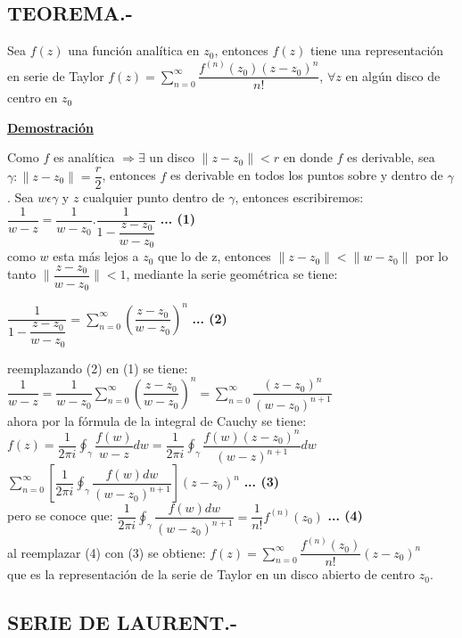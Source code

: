 \documentclass[10pt,a4paper]{article}
\begin{document}
\subsection{TEOREMA.-}
Sea $f(z)$ una función analítica en $z_0$, entonces $f(z)$ tiene una representación en serie de Taylor $\displaystyle{f(z) = \sum_{n=0}^{\infty}\dfrac{f^{(n)}(z_0)(z-z_0)^n}{n!}}$, $\displaystyle{\forall z}$ en algún disco de centro en $z_0$\\
\begin{center}
 \bf \underline{Demostración}
 \end{center} 
 Como $f$ es analítica $\Rightarrow \exists$ un disco $\parallel z- z_0\parallel < r$ en donde $f$ es derivable, sea $\displaystyle{\gamma : \parallel z- z_0\parallel= \dfrac{r}{2}}$, entonces $f$ es derivable en todos los puntos sobre y dentro de $\gamma$.
 Sea $w \epsilon \gamma$ y $z$ cualquier punto dentro de $\gamma$, entonces escribiremos:\\
$\displaystyle{\dfrac{1}{w-z} = \dfrac{1}{w-z_0}. \dfrac{1}{1-\dfrac{z-z_0}{w-z_0}}}$ \textbf{... (1)}\\
como $w$ esta más lejos a $z_0$ que lo de z, entonces $\parallel  z - z_0\parallel < \parallel w - z_0 \parallel$ por lo tanto $\parallel \dfrac{z-z_0}{w-z_0} \parallel < 1$, mediante la serie geométrica se tiene:\\
\begin{center}
$\displaystyle{\dfrac{1}{1-\dfrac{z-z_0}{w-z_0}}= \sum_{n=0}^{\infty} (\dfrac{z - z_0}{w - z_0})^n}$ \textbf{... (2)}
\end{center}
reemplazando (2) en (1) se tiene: $\displaystyle{\dfrac{1}{w-z}= \dfrac{1}{w-z_0}\sum_{n=0}^{\infty} (\dfrac{z - z_0}{w - z_0})^n = \sum_{n=0}^{\infty} \dfrac{(z - z_0)^n}{(w - z_0)^{n+1}}}$ \\ ahora por la fórmula de la integral de Cauchy se tiene: \\
$\displaystyle{f(z) = \dfrac{1}{2 \pi i} \oint_\gamma \dfrac{f(w)}{w-z} dw = \dfrac{1}{2 \pi i} \oint_\gamma \dfrac{f(w)(z-z_0)^n}{(w-z)^{n+1}} dw }$\\
$\displaystyle{\sum_{n=0}^{\infty} [ \dfrac{1}{2 \pi i} \oint_\gamma \dfrac{f(w) dw}{(w-z_0)^{n+1}}] (z-z_0)^n}$ \textbf{... (3)}\\
pero se conoce que: $\displaystyle{\dfrac{1}{2 \pi i} \oint_\gamma \dfrac{f(w) dw}{(w-z_0)^{n+1}} = \dfrac{1}{n!} f^{(n)}(z_0)}$ \textbf{... (4)}\\
al reemplazar (4) con (3) se obtiene: $\displaystyle{f(z) = \sum_{n = 0}^{\infty} \dfrac{f^{(n)} (z_0)}{n!} (z-z_0)^n}$\\
que es la representación de la serie de Taylor en un disco abierto de centro $z_0$.
\subsection{SERIE DE LAURENT.-}
\end{document}
